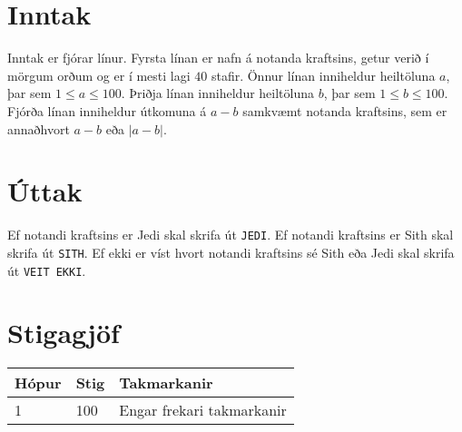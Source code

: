 \section*{Inntak}
Inntak er fjórar línur.
Fyrsta línan er nafn á notanda kraftsins, getur verið í mörgum orðum og er í mesti lagi $40$ stafir.
Önnur línan inniheldur heiltöluna $a$, þar sem $1 \leq a \leq 100$.
Þriðja línan inniheldur heiltöluna $b$, þar sem $1 \leq b \leq 100$.
Fjórða línan inniheldur útkomuna á $a-b$ samkvæmt notanda kraftsins, sem er annaðhvort $a-b$ eða $|a-b|$.

\section*{Úttak}
Ef notandi kraftsins er Jedi skal skrifa út \texttt{JEDI}.
Ef notandi kraftsins er Sith skal skrifa út \texttt{SITH}.
Ef ekki er víst hvort notandi kraftsins sé Sith eða Jedi skal skrifa út \texttt{VEIT EKKI}.

\section*{Stigagjöf}
\begin{tabular}{|l|l|l|}
\hline
Hópur & Stig & Takmarkanir \\ \hline
1     & 100  & Engar frekari takmarkanir\\ \hline
\end{tabular}

